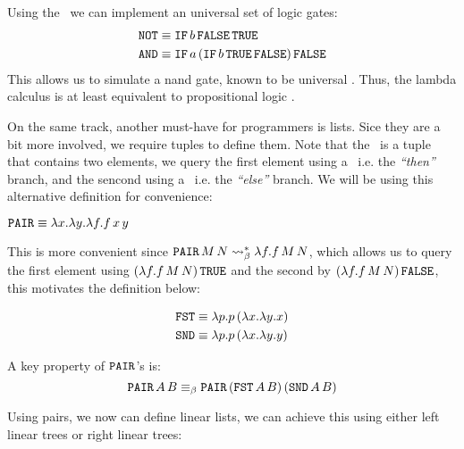 \documentclass[12pt]{book}
\begin{document}
\begin{remark}
  Using the \IF \ we can implement an universal set of logic gates:
  \begin{align*}
    \texttt{NOT} &\equiv \texttt{IF} \, b \, \texttt{FALSE} \, \texttt{TRUE} \\
    \texttt{AND} &\equiv \texttt{IF} \, a \, (\texttt{IF} \, b \, \texttt{TRUE} \, \texttt{FALSE}) \, \texttt{FALSE}
  \end{align*}
  This allows us to simulate a nand gate, known to be universal . Thus, the lambda calculus is at least equivalent to propositional logic .
\end{remark}
On the same track, another must-have for programmers is lists. Sice they are a bit more involved, we require tuples to define them. Note that the \IF \ is a tuple that contains two elements, we query the first element using a \TRUE \ i.e. the \textit{``then''} branch, and the sencond using a \FALSE \ i.e. the \textit{``else''} branch. We will be using this alternative definition for convenience:
\begin{definition} \( \texttt{PAIR} \equiv \lambda x.\lambda y.\lambda f. f\,x\,y \)
\end{definition}
\begin{remark}
  This is more convenient since $ \texttt{PAIR} \, M \, N \mathrel{\leadsto}_\beta^* \lambda f . f \, M \, N  $, which allows us to query the first element using $ (\lambda f . f \, M \, N) \, \texttt{TRUE} $ and the second by $ (\lambda f . f \, M \, N) \, \texttt{FALSE} $, this motivates the definition below:
\end{remark}
\begin{definition}
\begin{align*}
  \texttt{FST} &\equiv \lambda p. p\,(\lambda x.\lambda y. x) \\
  \texttt{SND} &\equiv \lambda p. p\,(\lambda x.\lambda y. y)
\end{align*}
\end{definition}
\begin{proposition} A key property of $ \texttt{PAIR} $'s is:
  \[\texttt{PAIR} \, A \, B \equiv_\beta \texttt{PAIR} \, (\texttt{FST} \, A \, B) \, (\texttt{SND} \, A \, B) \]
\end{proposition}
Using pairs, we now can define linear lists, we can achieve this using either left linear trees or right linear trees:
\end{document}
